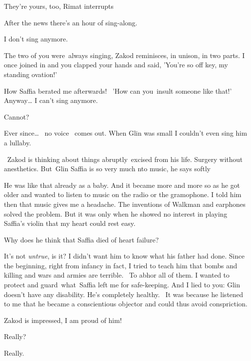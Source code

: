 \documentclass[letterpaper]{article}
\begin{document}
{\textquotedbl}They're yours, too,{\textquotedbl} Rimat interrupts 

{\textquotedbl}After the news there's an hour of sing-along.{\textquotedbl} 

{\textquotedbl}I don't sing anymore.{\textquotedbl} 

{\textquotedbl}The two of you were~always singing,{\textquotedbl} Zakod reminisces, {\textquotedbl}in unison, in two
parts. I once joined in and you clapped your hands and said, 'You're so off key, my standing ovation!'{\textquotedbl} 

{\textquotedbl}How Saffia berated me afterwards! \ {}'How can you~insult someone like that!' Anyway{\dots} I can't sing
anymore.{\textquotedbl} 

{\textquotedbl}Cannot?{\textquotedbl} 

{\textquotedbl}Ever since{\dots} ~no voice ~comes out. When Glin was small I couldn't even sing him a
lullaby.{\textquotedbl} 

~Zakod is thinking about things abruptly~excised from his life. Surgery without anesthetics. {\textquotedbl}But~Glin
Saffia is so very much nto music,{\textquotedbl} he says softly

{\textquotedbl}He was like that already as a baby. And it became more and more so as he got older and wanted to listen
to music on the radio or the gramophone. I told him then that music gives me a headache. The inventions of Walkman and
earphones solved the problem. But it was only when he showed no interest in playing Saffia's violin that my heart could
rest easy.{\textquotedbl} 

{\textquotedbl}Why does he think that Saffia died of heart failure?{\textquotedbl} ~

{\textquotedbl}It's not\textit{ untrue}, is it? I didn't want him to know what his father had done. Since the beginning,
right from infancy in fact, I tried to teach him that bombs and killing and wars and armies are terrible.~ To abhor all
of them. I wanted to protect and guard~what~Saffia left me for safe-keeping. And I lied to you: Glin doesn't have any
disability. He's completely healthy. ~It was because he listened to me that he became a conscientious objector and
could thus avoid conspriction.{\textquotedbl}{ }

Zakod is impressed, {\textquotedbl}I am proud of him!{\textquotedbl} 

{\textquotedbl}Really?{\textquotedbl} 

{\textquotedbl}Really.{\textquotedbl}~ 
\end{document}

